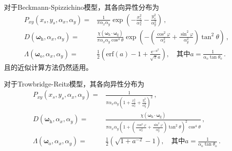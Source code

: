 对于Beckmann-Spizzichino模型，其各向异性分布为
\begin{align}
    P_{xy}(x_s,y_s,\alpha_x,\alpha_y)=&\frac{1}{\pi\alpha_x\alpha_y}\exp\left(-\frac{x_s^2}{\alpha_x^2}-\frac{y_s^2}{\alpha_y^2}\right)\, ,\\
    D({\bm\omega}_{\mathrm{h}},\alpha_x,\alpha_y)=&\frac{\chi({\bm\omega}_{\mathrm{h}}\cdot{\bm\omega}_{\mathrm{g}})}
    {\pi\alpha_x\alpha_y\cos^4\theta}\exp\left(-\left(\frac{\cos^2\varphi}{\alpha_x^2}
    +\frac{\sin^2\varphi}{\alpha_y^2}\right)\tan^2\theta\right)\, ,\\
    \Lambda({\bm\omega}_{\mathrm{o}},\alpha_x,\alpha_y)=&\frac{1}{2}\left(\mathrm{erf}(a)-1
    +\frac{\mathrm{e}^{-a^2}}{\sqrt{\pi}a}\right),
    \quad\text{其中}a=\displaystyle\frac{1}{\alpha_{\mathrm{o}}\tan\theta_{\mathrm{o}}}\, .
\end{align}
且的近似计算方法仍然适用。

对于Trowbridge-Reitz模型，其各向异性分布为
\begin{align}
    P_{xy}(x_s,y_s,\alpha_x,\alpha_y)=&\frac{1}{\displaystyle\pi\alpha_x\alpha_y\left(1
    +\frac{x_s^2}{\alpha_x^2}+\frac{y_s^2}{\alpha_y^2}\right)^2}\, ,\\
    D({\bm\omega}_{\mathrm{h}},\alpha_x,\alpha_y)=&\frac{\chi({\bm\omega}_{\mathrm{h}}\cdot{\bm\omega}_{\mathrm{g}})}
    {\displaystyle\pi\alpha_x\alpha_y\left(1+\left(\frac{\cos^2\varphi}{\alpha_x^2}
    +\frac{\sin^2\varphi}{\alpha_y^2}\right)\tan^2\theta\right)^2\cos^4\theta}\, ,\\
    \Lambda({\bm\omega}_{\mathrm{o}},\alpha_x,\alpha_y)=&\frac{1}{2}(\sqrt{1+a^{-2}}-1),
    \quad\text{其中}a=\displaystyle\frac{1}{\alpha_{\mathrm{o}}\tan\theta_{\mathrm{o}}}\, .
\end{align}

